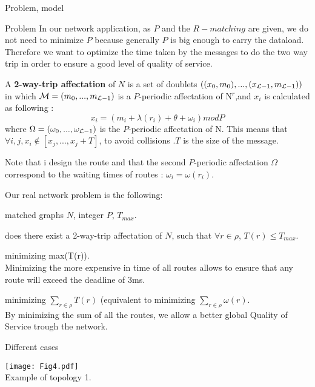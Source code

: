 \documentclass[a4paper,10pt]{report}
\begin{document}
\begin{chapter}{Problem, model}
\begin{section}{Problem}
In our network application, as $P$ and the $R-matching$ are given, we do not need to minimize $P$ because generally $P$ is big enough to carry the dataload.
Therefore we want to optimize the time taken by the messages to do the two way trip in order to ensure a good level of quality of service.

A {\bf 2-way-trip affectation} of $N$ is a set of doublets $ ((x_0,m_0),...,(x_{{\cal L}-1},m_{{\cal L}-1}))$ in which ${\cal M} = (m_0,...,m_{{\cal L}-1})$ 
is a $P$-periodic affectation of N$^r$,and $x_i$ is calculated as following :
$$ x_i = ( m_i + \lambda(r_i) + \theta + \omega_i ) mod P $$
where ${\Omega} = (\omega_0,...,\omega_{{\cal L}-1}) $ is the $P$-periodic affectation of N. This means that $\forall i,j,x_i \notin [x_j,...,x_j+T]$, to avoid collisions
.$T$ is the size of the message.

Note that i design the route and that the second $P$-periodic affectation ${\Omega}$ correspond to the waiting times of routes : $\omega_i = \omega(r_i)$.

Our real network problem is the following:\\


 matched graphs $N$, integer $P$, $ T_{max}$.

 does there exist a 2-way-trip affectation of $N$, such that $\forall r \in \rho$, $T(r) \le T_{max}$.

 minimizing max(T(r)).\\

Minimizing the more expensive in time of all routes allows to ensure that any route will exceed the deadline of 3ms.

 minimizing $\sum_{r \in \rho}  T(r)$ (equivalent to minimizing $\sum_{r \in \rho}  \omega(r)$.\\

By minimizing the sum of all the routes, we allow a better global Quality of Service trough the network.\\
\begin{subsection}{Different cases}
\begin{center}
 
\texttt{[image: Fig4.pdf]}\\
Example of topology 1.
\end{center}




\end{subsection}
\end{section}
\end{chapter}
\end{document}
